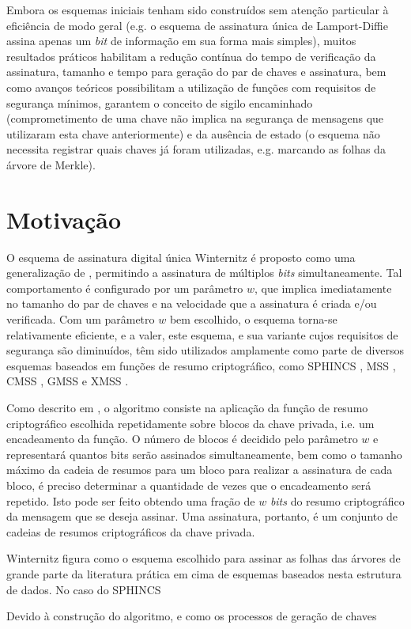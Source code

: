 \documentclass{article}
\begin{document}
Embora os esquemas iniciais tenham sido construídos sem atenção particular à
eficiência de modo geral (e.g. o esquema de assinatura única de Lamport-Diffie
\cite{Lamport1979} assina apenas um \emph{bit} de informação em sua forma mais
simples), muitos resultados práticos habilitam a redução contínua do tempo de
verificação da assinatura, tamanho e tempo para geração do par de chaves e
assinatura, bem como avanços teóricos possibilitam a utilização de funções com
requisitos de segurança mínimos, garantem o conceito de sigilo encaminhado
\cite{Buchmann:2011:XPF:2184003.2184011} (comprometimento de uma chave não
implica na segurança de mensagens que utilizaram esta chave anteriormente) e da
ausência de estado \cite{Bernstein2015} (o esquema não necessita registrar
quais chaves já foram utilizadas, e.g. marcando as folhas da árvore de Merkle).

\section{Motivação}

O esquema de assinatura digital única Winternitz é proposto como uma
generalização de \cite{Lamport1979}, permitindo a assinatura de múltiplos
\emph{bits} simultaneamente. Tal comportamento é configurado por um parâmetro
$w$, que implica imediatamente no tamanho do par de chaves e na velocidade que
a assinatura é criada e/ou verificada. Com um parâmetro $w$ bem escolhido, o
esquema torna-se relativamente eficiente, e a valer, este esquema, e sua
variante \cite{cryptoeprint:2017:965} cujos requisitos de segurança são
diminuídos, têm sido utilizados amplamente como parte de diversos esquemas
baseados em funções de resumo criptográfico, como SPHINCS \cite{Bernstein2015},
MSS \cite{Merkle:1989:CDS:118209.118230}, CMSS \cite{Buchmann2006}, GMSS
\cite{Buchmann2007} e XMSS \cite{Buchmann:2011:XPF:2184003.2184011}.

Como descrito em \cite{Bernstein:2008:PQC:1522375}, o algoritmo consiste na
aplicação da função de resumo criptográfico escolhida repetidamente sobre
blocos da chave privada, i.e. um encadeamento da função. O número de blocos
é decidido pelo parâmetro $w$ e representará quantos bits serão assinados
simultaneamente, bem como o tamanho máximo da cadeia de resumos para um
bloco para realizar a assinatura de cada bloco, é preciso determinar a
quantidade de vezes que o encadeamento será repetido. Isto pode ser feito
obtendo uma fração de $w$ \emph{bits} do resumo criptográfico da mensagem
que se deseja assinar. Uma assinatura, portanto, é um conjunto de cadeias
de resumos criptográficos da chave privada.

Winternitz figura como o esquema escolhido para assinar as folhas das
árvores de grande parte da literatura prática em cima de esquemas baseados
nesta estrutura de dados. No caso do SPHINCS

Devido à construção do algoritmo, e como os processos de geração de chaves




\end{document}
